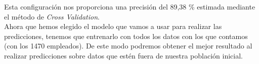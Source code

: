 

Esta configuración nos proporciona una precisión del 89,38 \% estimada mediante el método de \textit{Cross Validation}.\\



Ahora que hemos elegido el modelo que vamos a usar para realizar las predicciones, tenemos que entrenarlo con todos los datos con los que contamos (con los 1470 empleados).
De este modo podremos obtener el mejor resultado al realizar predicciones sobre datos que estén fuera de nuestra población inicial.\\










